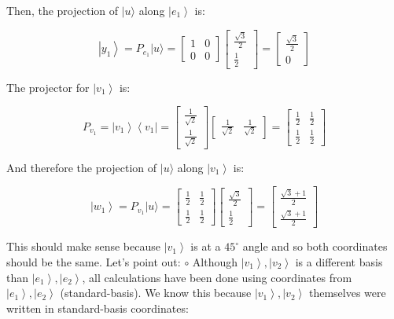 \documentclass[main.tex]{subfiles}
\begin{document}
    Then, the projection of $|u\rangle$ along $\left|e_{1}\right\rangle$ is:
    
    $$
    \left|y_{1}\right\rangle=P_{e_{1}}|u\rangle=\left[\begin{array}{ll}
    1 & 0 \\
    0 & 0
    \end{array}\right]\left[\begin{array}{c}
    \frac{\sqrt{3}}{2} \\
    \frac{1}{2}
    \end{array}\right]=\left[\begin{array}{c}
    \frac{\sqrt{3}}{2} \\
    0
    \end{array}\right]
    $$
    
    The projector for $\left|v_{1}\right\rangle$ is:
    
    $$
    P_{v_{1}}=\left|v_{1}\right\rangle\left\langle v_{1}\right|=\left[\begin{array}{c}
    \frac{1}{\sqrt{2}} \\
    \frac{1}{\sqrt{2}}
    \end{array}\right]\left[\begin{array}{ll}
    \frac{1}{\sqrt{2}} & \frac{1}{\sqrt{2}}
    \end{array}\right]=\left[\begin{array}{ll}
    \frac{1}{2} & \frac{1}{2} \\
    \frac{1}{2} & \frac{1}{2}
    \end{array}\right]
    $$
    
    And therefore the projection of $|u\rangle$ along $\left|v_{1}\right\rangle$ is:
    
    $$
    \left|w_{1}\right\rangle=P_{v_{1}}|u\rangle=\left[\begin{array}{cc}
    \frac{1}{2} & \frac{1}{2} \\
    \frac{1}{2} & \frac{1}{2}
    \end{array}\right]\left[\begin{array}{c}
    \frac{\sqrt{3}}{2} \\
    \frac{1}{2}
    \end{array}\right]=\left[\begin{array}{c}
    \frac{\sqrt{3}+1}{2} \\
    \frac{\sqrt{3}+1}{2}
    \end{array}\right]
    $$
    
    This should make sense because $\left|v_{1}\right\rangle$ is at a $45^{\circ}$ angle and so both coordinates should be the same. Let's point out: $\circ$ Although $\left|v_{1}\right\rangle,\left|v_{2}\right\rangle$ is a different basis than $\left|e_{1}\right\rangle,\left|e_{2}\right\rangle$, all calculations have been done using coordinates from $\left|e_{1}\right\rangle,\left|e_{2}\right\rangle$ (standard-basis). We know this because $\left|v_{1}\right\rangle,\left|v_{2}\right\rangle$ themselves were written in standard-basis coordinates:
    
\end{document}

